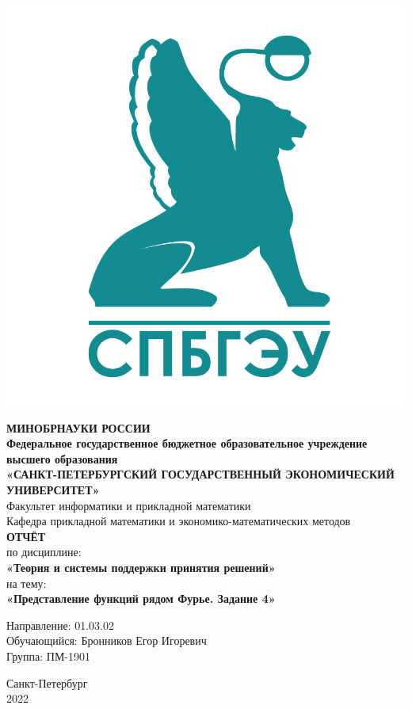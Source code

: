 \documentclass[14pt,fleqn]{extarticle}
\begin{document}
	\begin{titlepage}
		\includegraphics[scale=0.12]{logo}
		\begin{center}
			\textbf{МИНОБРНАУКИ РОССИИ}\\
			\vspace{0.2cm}
			\textbf{Федеральное государственное бюджетное образовательное учреждение высшего образования}\\
			\textbf{«САНКТ-ПЕТЕРБУРГСКИЙ ГОСУДАРСТВЕННЫЙ ЭКОНОМИЧЕСКИЙ УНИВЕРСИТЕТ»}\\
			\vspace{0.6cm}
			Факультет информатики и прикладной математики\\
			Кафедра прикладной математики и экономико-математических методов\\
			\vspace{1cm}
			\textbf{ОТЧЁТ}\\
			по дисциплине:\\
			\textbf{«Теория и системы поддержки принятия решений»}\\
			на тему:\\
			\textbf{«Представление функций рядом Фурье. Задание 4»}\\
		\end{center}
		\vspace{1cm}
		Направление: 01.03.02\\
		Обучающийся: Бронников Егор Игоревич\\
		Группа: ПМ-1901\\
		\vfill
		\begin{center}
			Санкт-Петербург\\
			2022\\
		\end{center}
	\end{titlepage}
	
\end{document}
